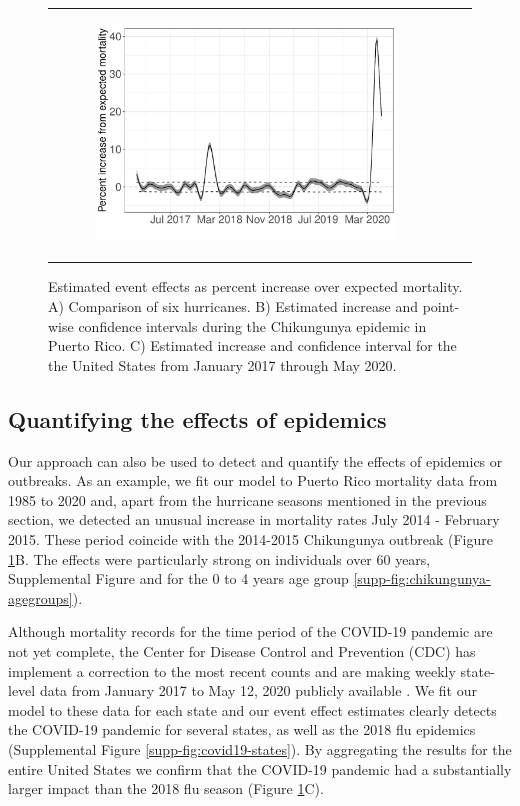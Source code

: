 \documentclass[11pt]{article}
\begin{document}
\begin{figure}[ht]
\begin{tabular}{lll}
\begin{subfigure}[t]{0.30\linewidth}
		\includegraphics[width=1\linewidth]{figs/figure-1c.pdf}
	\end{subfigure}\\
    \end{tabular}
    \caption{Estimated event effects as percent increase over expected mortality. A) Comparison of six hurricanes. B) Estimated increase and point-wise confidence intervals  during the Chikungunya epidemic in Puerto Rico. C) Estimated increase and confidence interval for the the United States from January 2017 through May 2020.}
    \label{fig:fhat-estimates}
\end{figure}

\subsection{Quantifying the effects of epidemics}
\label{subsec:epidemics}
Our approach can also be used to detect and quantify the effects of epidemics or outbreaks. As an example, we fit our model to Puerto Rico mortality data from 1985 to 2020 and, apart from the hurricane seasons mentioned in the previous section, we detected an unusual increase in mortality rates July 2014 - February 2015. These period coincide with the 2014-2015 Chikungunya outbreak \cite{sharp2016surveillance, hsu2019risk}  (Figure \ref{fig:fhat-estimates}B. The effects were particularly strong on individuals over 60 years, Supplemental Figure and for the  0 to 4 years age group \ref{supp-fig:chikungunya-agegroups}).

Although mortality records for the time period of the COVID-19 pandemic are not yet complete, the Center for Disease Control and Prevention (CDC) has implement a correction to the most recent counts and are making weekly state-level data from January 2017 to May 12, 2020 publicly available \cite{cdc2020covid19}. We fit our model to these data for each state and our event effect estimates clearly detects the COVID-19 pandemic for several states, as well as the 2018 flu epidemics (Supplemental Figure \ref{supp-fig:covid19-states}). By aggregating the results for the entire United States we confirm that the COVID-19 pandemic had a substantially larger impact than the 2018 flu season
(Figure \ref{fig:fhat-estimates}C).
 
\end{document}
